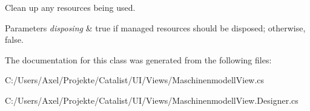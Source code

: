 Clean up any resources being used. 


\begin{DoxyParams}{Parameters}
{\em disposing} & true if managed resources should be disposed; otherwise, false.\\
\hline
\end{DoxyParams}


The documentation for this class was generated from the following files\+:\begin{DoxyCompactItemize}
\item 
C\+:/\+Users/\+Axel/\+Projekte/\+Catalist/\+U\+I/\+Views/Maschinenmodell\+View.\+cs\item 
C\+:/\+Users/\+Axel/\+Projekte/\+Catalist/\+U\+I/\+Views/Maschinenmodell\+View.\+Designer.\+cs\end{DoxyCompactItemize}
